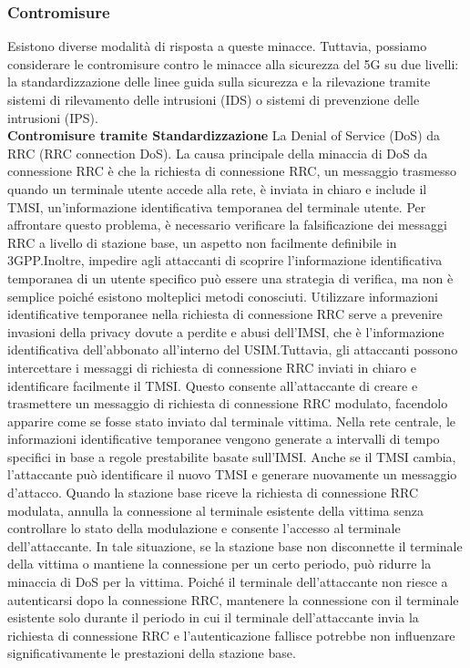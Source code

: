 \documentclass[english]{article}
\begin{document}
\subsubsection{Contromisure}
Esistono diverse modalità di risposta a queste minacce. Tuttavia, possiamo
considerare le contromisure contro le minacce alla sicurezza del 5G su due
livelli: la standardizzazione delle linee guida sulla sicurezza e la
rilevazione tramite sistemi di rilevamento delle intrusioni (IDS) o sistemi di
prevenzione delle intrusioni (IPS). \\[0.2cm]
\textbf{Contromisure tramite Standardizzazione}
La Denial of Service (DoS) da RRC (RRC connection DoS).
La causa principale della minaccia di DoS da connessione RRC è che la richiesta
di connessione RRC, un messaggio trasmesso quando un terminale utente accede alla rete,
è inviata in chiaro e include il TMSI, un'informazione identificativa
temporanea del terminale utente. Per affrontare questo problema, è necessario verificare
la falsificazione dei messaggi RRC a livello di stazione base, un aspetto non facilmente
definibile in 3GPP.\@ Inoltre, impedire agli attaccanti di scoprire l'informazione
identificativa temporanea di un utente specifico può essere una strategia di verifica,
ma non è semplice poiché esistono molteplici metodi conosciuti. Utilizzare informazioni
identificative temporanee nella richiesta di connessione RRC serve a prevenire invasioni
della privacy dovute a perdite e abusi dell'IMSI, che è l'informazione identificativa
dell'abbonato all'interno del USIM.\@ Tuttavia, gli attaccanti possono intercettare i
messaggi di richiesta di connessione RRC inviati in chiaro e identificare facilmente il TMSI.\@
Questo consente all'attaccante di creare e trasmettere un messaggio di richiesta di connessione
RRC modulato, facendolo apparire come se fosse stato inviato dal terminale vittima.
Nella rete centrale, le informazioni identificative temporanee vengono generate a intervalli
di tempo specifici in base a regole prestabilite basate sull'IMSI. Anche se il TMSI cambia,
l'attaccante può identificare il nuovo TMSI e generare nuovamente un messaggio d'attacco.
Quando la stazione base riceve la richiesta di connessione RRC modulata, annulla la connessione
al terminale esistente della vittima senza controllare lo stato della modulazione e consente
l'accesso al terminale dell'attaccante. In tale situazione, se la stazione base non disconnette
il terminale della vittima o mantiene la connessione per un certo periodo, può ridurre la
minaccia di DoS per la vittima. Poiché il terminale dell'attaccante non riesce a autenticarsi
dopo la connessione RRC, mantenere la connessione con il terminale esistente solo durante
il periodo in cui il terminale dell'attaccante invia la richiesta di connessione RRC e
l'autenticazione fallisce potrebbe non influenzare significativamente le prestazioni della stazione base.
\end{document}
